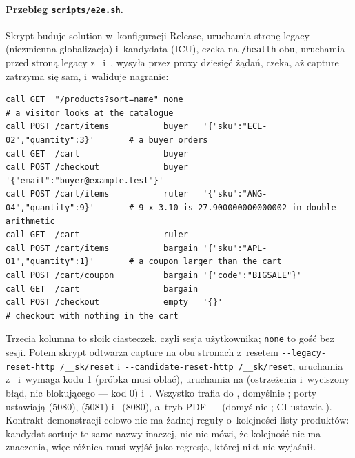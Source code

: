 \paragraph{Przebieg \texttt{scripts/e2e.sh}.} Skrypt buduje solution w~konfiguracji Release,
uruchamia stronę legacy (niezmienna globalizacja) i~kandydata (ICU), czeka na
\texttt{/health} obu, uruchamia  przed stroną legacy z~ i~, wysyła przez proxy
dziesięć żądań, czeka, aż capture zatrzyma się sam, i~waliduje nagranie:

\begin{lstlisting}
call GET  "/products?sort=name" none                                          # a visitor looks at the catalogue
call POST /cart/items           buyer   '{"sku":"ECL-02","quantity":3}'       # a buyer orders
call GET  /cart                 buyer
call POST /checkout             buyer   '{"email":"buyer@example.test"}'
call POST /cart/items           ruler   '{"sku":"ANG-04","quantity":9}'       # 9 x 3.10 is 27.900000000000002 in double arithmetic
call GET  /cart                 ruler
call POST /cart/items           bargain '{"sku":"APL-01","quantity":1}'       # a coupon larger than the cart
call POST /cart/coupon          bargain '{"code":"BIGSALE"}'
call GET  /cart                 bargain
call POST /checkout             empty   '{}'                                  # checkout with nothing in the cart
\end{lstlisting}

Trzecia kolumna to słoik ciasteczek, czyli sesja użytkownika; \texttt{none} to gość bez
sesji. Potem skrypt odtwarza capture na obu stronach z~resetem
\texttt{-{}-legacy-reset-http /\_\_sk/reset} i~\texttt{-{}-candidate-reset-http
/\_\_sk/reset}, uruchamia  z~ i~wymaga kodu 1
(próbka musi oblać), uruchamia  na 
(ostrzeżenia i~wyciszony błąd, nic blokującego --- kod 0) i~. Wszystko
trafia do , domyślnie ; porty ustawiają
 (5080),  (5081) i~ (8080), a~tryb PDF ---  (domyślnie
; CI ustawia ). Kontrakt demonstracji celowo nie ma żadnej
reguły o~kolejności listy produktów: kandydat sortuje te same nazwy inaczej, nic nie mówi,
że kolejność nie ma znaczenia, więc różnica musi wyjść jako regresja, której nikt nie
wyjaśnił.

